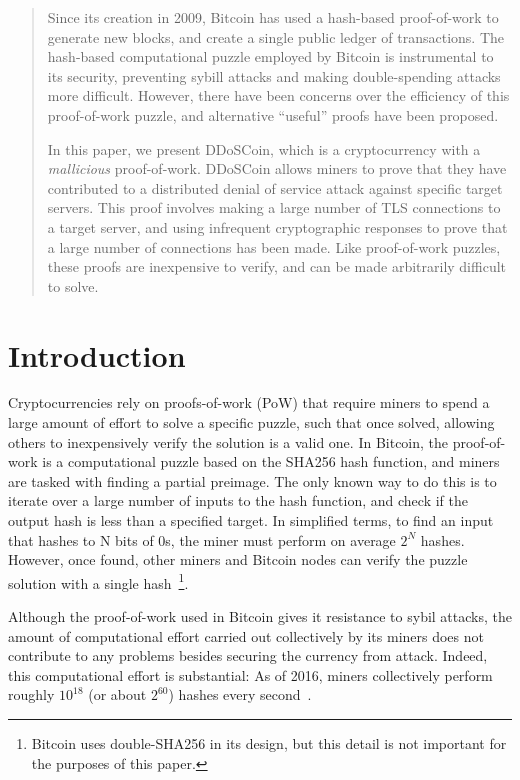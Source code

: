 



\begin{abstract}

Since its creation in 2009, Bitcoin has used a hash-based proof-of-work to
generate new blocks, and create a single public ledger of transactions. The
hash-based computational puzzle employed by Bitcoin is instrumental to its
security, preventing sybill attacks and making double-spending attacks more
difficult. However, there have been concerns over the efficiency of this
proof-of-work puzzle, and alternative ``useful'' proofs have been proposed.

In this paper, we present DDoSCoin, which is a cryptocurrency with a
\emph{mallicious} proof-of-work. DDoSCoin allows miners to prove that they have
contributed to a distributed denial of service attack against specific target
servers.  This proof involves making a large number of TLS connections to a
target server, and using infrequent cryptographic responses to prove that a
large number of connections has been made. Like proof-of-work puzzles, these
proofs are inexpensive to verify, and can be made arbitrarily difficult to
solve.

\end{abstract}




\section{Introduction}

Cryptocurrencies rely on proofs-of-work (PoW) that
require miners to spend a large amount of effort to solve a specific puzzle,
such that once solved, allowing others to inexpensively verify the solution is a
valid one. In Bitcoin, the proof-of-work is a computational puzzle based on the
SHA256 hash function, and miners are tasked with finding a partial preimage. The
only known way to do this is to iterate over a large number of inputs to the
hash function, and check if the output hash is less than a specified target. In
simplified terms, to find an input that hashes to N bits of 0s, the miner must
perform on average $2^{N}$ hashes. However, once found, other miners and Bitcoin
nodes can verify the puzzle solution with
a single hash~\footnote{Bitcoin uses double-SHA256 in its design, but this
detail is not important for the purposes of this paper.}.


Although the proof-of-work used in Bitcoin gives it resistance to sybil attacks,
the amount of computational effort carried out collectively by its miners does
not contribute to any problems besides securing the currency from attack.
Indeed, this computational effort is substantial: As of 2016, miners
collectively perform roughly $10^{18}$ (or about $2^{60}$) hashes every
second~\cite{blockchain-hashrate}.

